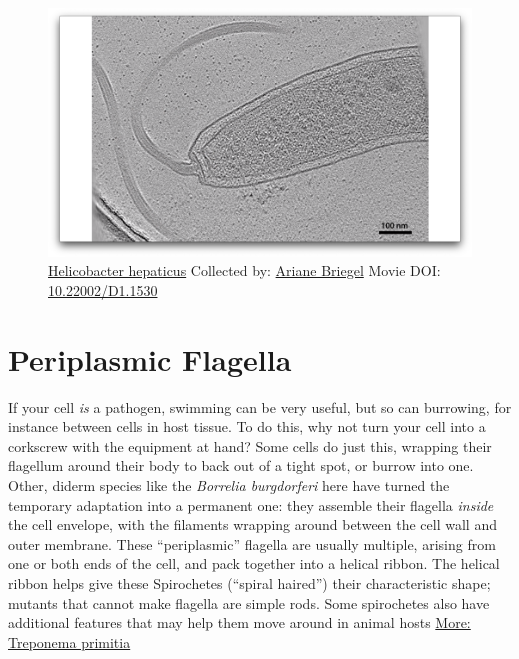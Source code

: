 \documentclass[]{tufte-book}
\begin{document}
\begin{figure}
\includegraphics{movie_stills/6_6} \caption[\protect\hyperlink{tree}{Helicobacter hepaticus} Collected by:
\protect\hyperlink{ariane_briegel}{Ariane Briegel} Movie DOI:
\href{https://doi.org/10.22002/D1.1530}{10.22002/D1.1530}]{\protect\hyperlink{tree}{Helicobacter hepaticus} Collected by:
\protect\hyperlink{ariane_briegel}{Ariane Briegel} Movie DOI:
\href{https://doi.org/10.22002/D1.1530}{10.22002/D1.1530}}\label{fig:6-6}
\end{figure}

\section{Periplasmic Flagella}\label{periplasmic-flagella}

If your cell \emph{is} a pathogen, swimming can be very useful, but so
can burrowing, for instance between cells in host tissue. To do this,
why not turn your cell into a corkscrew with the equipment at hand? Some
cells do just this, wrapping their flagellum around their body to back
out of a tight spot, or burrow into one. Other, diderm species like the
\emph{Borrelia burgdorferi} here have turned the temporary adaptation
into a permanent one: they assemble their flagella \emph{inside} the
cell envelope, with the filaments wrapping around between the cell wall
and outer membrane. These ``periplasmic'' flagella are usually multiple,
arising from one or both ends of the cell, and pack together into a
helical ribbon. The helical ribbon helps give these Spirochetes
(``spiral haired'') their characteristic shape; mutants that cannot make
flagella are simple rods. Some spirochetes also have additional features
that may help them move around in animal hosts
\protect\hyperlink{Treponema_primitia}{More: Treponema primitia}
\end{document}
